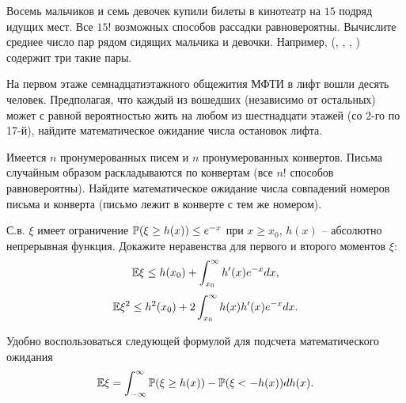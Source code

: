 \begin{problem}
Восемь мальчиков и семь девочек купили билеты в кинотеатр на $15$ подряд идущих мест. Все $15!$ возможных способов рассадки равновероятны. Вычислите среднее число пар рядом сидящих мальчика и девочки. Например, (\mars, \female, \mars, \female) содержит три такие пары. 
\end{problem}


\begin{problem}
На первом этаже семнадцатиэтажного общежития МФТИ в лифт вошли десять человек. Предполагая, что каждый из вошедших (независимо от остальных) может с равной вероятностью жить на любом из шестнадцати этажей (со 2-го по 17-й), найдите математическое ожидание числа остановок лифта.
\end{problem}



\begin{problem}
\label{sec:latters}
Имеется $n$ пронумерованных писем и $n$ пронумерованных конвертов. Письма случайным образом раскладываются по конвертам (все $n!$ 
способов равновероятны). 
Найдите математическое ожидание числа совпадений номеров письма и конверта (письмо лежит в конверте с тем же номером). 
\end{problem}

\begin{problem}
\label{mom_ineq}
С.в. $\xi$ имеет ограничение $\mathrm{{\mathbb P}}(\xi \geq h(x)) \leq e^{-x}$ при $x \geq x_0$, $h(x)$ -- абсолютно непрерывная функция. Докажите неравенства для первого и второго моментов $\xi$:
\[
\mathrm{{\mathbb E}} \xi \leq h(x_0) + \int_{x_0}^{\infty}h'(x)e^{-x}dx,
\]
\[
\mathrm{{\mathbb E}} \xi^2 \leq h^2(x_0) +  2\int_{x_0}^{\infty}h(x) h'(x)e^{-x}dx.
\]
\end{problem}

\begin{ordre}
Удобно воспользоваться следующей формулой для подсчета математического ожидания 
\[
\mathrm{{\mathbb E}} \xi = \int_{-\infty}^{\infty} \mathrm{{\mathbb P}}(\xi \geq h(x)) - \mathrm{{\mathbb P}}(\xi < -h(x))d h(x).
\]
\end{ordre}





